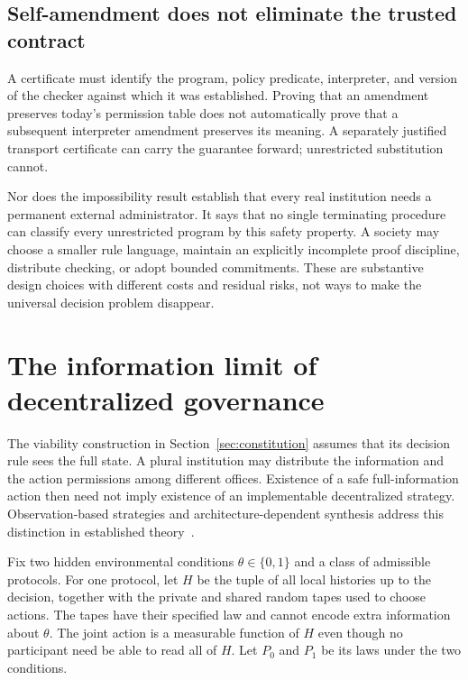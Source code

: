 \documentclass[11pt,letterpaper]{article}
\theoremstyle{plain}
\theoremstyle{definition}
\theoremstyle{remark}
\begin{document}
\subsection{Self-amendment does not eliminate the trusted contract}
A certificate must identify the program, policy predicate, interpreter, and version of the checker against which it was established. Proving that an amendment preserves today's permission table does not automatically prove that a subsequent interpreter amendment preserves its meaning. A separately justified transport certificate can carry the guarantee forward; unrestricted substitution cannot.

Nor does the impossibility result establish that every real institution needs a permanent external administrator. It says that no single terminating procedure can classify every unrestricted program by this safety property. A society may choose a smaller rule language, maintain an explicitly incomplete proof discipline, distribute checking, or adopt bounded commitments. These are substantive design choices with different costs and residual risks, not ways to make the universal decision problem disappear.

\section{The information limit of decentralized governance}\label{sec:decentral}
The viability construction in Section~\ref{sec:constitution} assumes that its decision rule sees the full state. A plural institution may distribute the information and the action permissions among different offices. Existence of a safe full-information action then need not imply existence of an implementable decentralized strategy. Observation-based strategies and architecture-dependent synthesis address this distinction in established theory~\cite{chatterjee,pnuelirosner}.

Fix two hidden environmental conditions $\theta\in\{0,1\}$ and a class of admissible protocols. For one protocol, let $H$ be the tuple of all local histories up to the decision, together with the private and shared random tapes used to choose actions. The tapes have their specified law and cannot encode extra information about $\theta$. The joint action is a measurable function of $H$ even though no participant need be able to read all of $H$. Let $P_0$ and $P_1$ be its laws under the two conditions.
\end{document}
